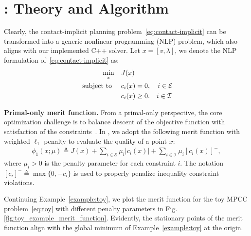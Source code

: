 

\section{\crisp: Theory and Algorithm}
\label{sec:method}
Clearly, the contact-implicit planning problem~\eqref{eq:contact-implicit} can be transformed into a generic nonlinear programming (NLP) problem, which also aligns with our implemented C++ solver. Let $x = [v, \lambda]$, we denote the NLP formulation of~\eqref{eq:contact-implicit} as:
\begin{subequations}\label{eq:problem_general} 
    \begin{align}
        \min_x &\quad J(x) \\
        \text{ subject to } &\quad c_i(x) = 0, \quad i \in \mathcal{E} \label{eq:general:eq}\\
        &\quad c_i(x) \ge 0. \quad i \in \mathcal{I} \label{eq:general:ineq}
    \end{align}
\end{subequations}

\textbf{Primal-only merit function.}
From a primal-only perspective, the core optimization challenge is to balance descent of the objective function with satisfaction of the constraints~\cite{nocedal1999springer-numerical-optimization}. 
In \crisp, we adopt the following merit function with weighted $\ell_1$ penalty to evaluate the quality of a point $x$:
\begin{align}
    \label{eq:merit-func}
    \phi_1(x;\mu) \triangleq J(x) +  \sum_{i \in \mathcal{E}} \mu_i| c_i(x) | + \sum_{i \in \mathcal{I}} \mu_i [c_i(x)]^-,
\end{align}
where $\mu_i > 0$ is the penalty parameter for each constraint $i$. The notation $[c_i]^- \triangleq \max\{0, -c_i\}$ is used to properly penalize inequality constraint violations. 

\begin{example}\label{ex:toy:merit}
    Continuing Example~\ref{example:toy}, we plot the merit function for the toy MPCC problem~\eqref{eq:toy} with different penalty parameters in Fig. \ref{fig:toy_example_merit_function}. Evidently, the stationary points of the merit function align with the global minimum of Example~\ref{example:toy} at the origin.
\end{example}

